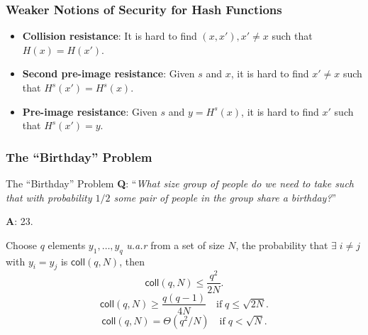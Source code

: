 \begin{frame}\frametitle{Weaker Notions of Security for Hash Functions}
\begin{figure}
\begin{center}

\end{center}
\end{figure}
\begin{itemize}
\item \textbf{Collision resistance}: It is hard to find $(x, x'), x' \ne x$ such that $H(x) = H(x')$.
\item \textbf{Second pre-image resistance}: Given $s$ and $x$, it is hard to find $x' \ne x$ such that $H^s(x') = H^s(x)$.
\item \textbf{Pre-image resistance}: Given $s$ and $y = H^s(x)$, it is hard to find $x'$ such that $H^s(x')=y$.
\end{itemize}
\end{frame}
\begin{frame}\frametitle{The ``Birthday'' Problem}
\begin{exampleblock}{The ``Birthday'' Problem}
\textbf{Q}: ``\emph{What size group of people do we need to take such that with probability $1/2$ some pair of people in the group share a birthday?}''

\textbf{A}: 23.
\end{exampleblock}
\begin{lemma}
Choose $q$ elements $y_1,\dotsc , y_q$ \emph{u.a.r} from a set of size $N$, the probability that $\exists \; i \ne j$ with $y_i = y_j$ is $\mathsf{coll}(q,N)$, then 
\[ \mathsf{coll}(q,N) \le \frac{q^2}{2N}.
\]
\[ \mathsf{coll}(q,N) \ge  \frac{q(q-1)}{4N}\quad \text{if}\; q \le \sqrt{2N}.
\]
\[ \mathsf{coll}(q,N) = \Theta(q^2/N)\quad \text{if}\; q < \sqrt{N}.
\]
\end{lemma}
\end{frame}
